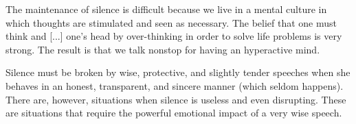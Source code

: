 \par The maintenance of silence is difficult because we live in a mental culture in which thoughts are stimulated and seen as necessary. The belief that one must think and [...] one's head by over-thinking in order to solve life problems is very strong. The result is that we talk nonstop for having an hyperactive mind.

\par Silence must be broken by wise, protective, and slightly tender speeches when she behaves in an honest, transparent, and sincere manner (which seldom happens). There are, however, situations when silence is useless and even disrupting. These are situations that require the powerful emotional impact of a very wise speech.
